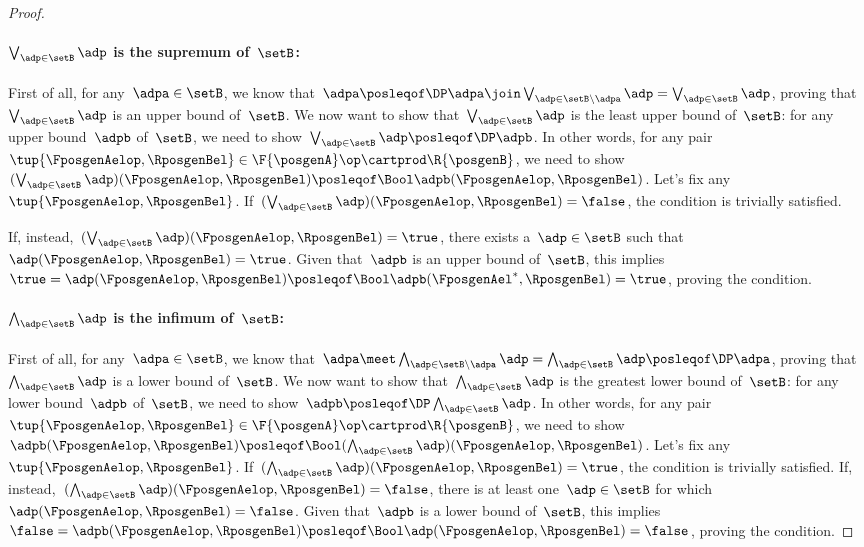 \begin{proof}
    \paragraph*{$\bigvee_{\adp \in \setB} \adp$ is the supremum of~$\setB$:}
    First of all, for any~$\adpa\in \setB$, we know that~$\adpa\posleqof\DP \adpa \join \bigvee_{\adp \in \setB \backslash \adpa} \adp= \bigvee_{\adp \in \setB} \adp$, proving that~$\bigvee_{\adp \in \setB} \adp$ is an upper bound of~$\setB$.
    We now want to show that~$\bigvee_{\adp \in \setB} \adp$ is the least upper bound of~$\setB$: for any upper bound~$\adpb$ of~$\setB$, we need to show~$\bigvee_{\adp \in \setB} \adp \posleqof\DP\adpb$.
    In other words, for any pair~$\tup{\FposgenAelop,\RposgenBel}\in \F{\posgenA}\op\cartprod \R{\posgenB}$, we need to show~$(\bigvee_{\adp \in \setB} \adp)(\FposgenAelop,\RposgenBel)\posleqof\Bool \adpb(\FposgenAelop,\RposgenBel)$.
    Let's fix any~$\tup{\FposgenAelop,\RposgenBel}$.
    If~$(\bigvee_{\adp \in \setB} \adp)(\FposgenAelop,\RposgenBel)=\false$, the condition is trivially satisfied.

    If, instead,~$(\bigvee_{\adp \in \setB} \adp)(\FposgenAelop,\RposgenBel)=\true$, there exists a~$\adp\in \setB$ such that~$\adp(\FposgenAelop,\RposgenBel)=\true$.
    Given that~$\adpb$ is an upper bound of~$\setB$, this implies~$\true=\adp(\FposgenAelop,\RposgenBel)\posleqof\Bool \adpb(\FposgenAel^*,\RposgenBel)=\true$, proving the condition.

    \paragraph*{$\bigwedge_{\adp \in \setB} \adp$ is the infimum of~$\setB$:}
    First of all, for any~$\adpa\in \setB$, we know that~$\adpa \meet \bigwedge_{\adp \in \setB \backslash \adpa} \adp= \bigwedge_{\adp \in \setB} \adp \posleqof\DP \adpa$, proving that~$\bigwedge_{\adp \in \setB} \adp$ is a lower bound of~$\setB$.
    We now want to show that~$\bigwedge_{\adp \in \setB} \adp$ is the greatest lower bound of~$\setB$: for any lower bound~$\adpb$ of~$\setB$, we need to show~$\adpb\posleqof\DP\bigwedge_{\adp \in \setB} \adp $.
    In other words, for any pair~$\tup{\FposgenAelop,\RposgenBel}\in \F{\posgenA}\op\cartprod \R{\posgenB}$, we need to show~$\adpb(\FposgenAelop,\RposgenBel) \posleqof\Bool (\bigwedge_{\adp \in \setB} \adp)(\FposgenAelop,\RposgenBel)$.
    Let's fix any~$\tup{\FposgenAelop,\RposgenBel}$.
    If~$(\bigwedge_{\adp \in \setB} \adp)(\FposgenAelop,\RposgenBel)=\true$, the condition is trivially satisfied.
    If, instead,~$(\bigwedge_{\adp \in \setB} \adp)(\FposgenAelop,\RposgenBel)=\false$, there is at least one~$\adp\in \setB$ for which~$\adp(\FposgenAelop,\RposgenBel)=\false$.
    Given that~$\adpb$ is a lower bound of~$\setB$, this implies~$\false=\adpb(\FposgenAelop,\RposgenBel)\posleqof\Bool \adp(\FposgenAelop,\RposgenBel)=\false$, proving the condition.
\end{proof}

